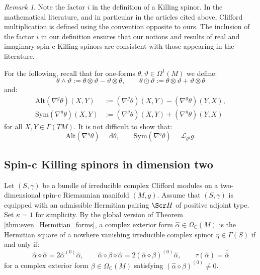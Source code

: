 \documentclass[10pt,a4paper,twoside,reqno]{amsart}
\theoremstyle{plain}
\theoremstyle{definition}
\theoremstyle{remark}
\newtheorem{remark}[thm]{Remark}
\def\C{\mathbb{C}}
\def\dd{\mathrm{d}}
\def\scS{\Scr H}
\def\dd{\mathrm{d}}
\begin{document}
\begin{remark}
    Note the factor $i$ in the definition of a Killing spinor. In the mathematical literature, and in particular in the articles cited above, Clifford multiplication is defined using the convention opposite to ours. The inclusion of the factor $i$ in our definition ensures that our notions and results of real and imaginary spin-c Killing spinors are consistent with those appearing in the literature.
\end{remark}

For the following, recall that for one-forms $\theta,\vartheta\in\Omega^1(M)$ we define: $$\theta\wedge\vartheta:=\theta\otimes\vartheta-\vartheta\otimes\theta,\qquad \theta\odot\vartheta:=\theta\otimes\vartheta+\vartheta\otimes\theta$$ and: \begin{align*}
    \mathrm{Alt}(\nabla^g\theta)(X,Y)&:=(\nabla^g\theta)(X,Y)-(\nabla^g\theta)(Y,X),\\
    \mathrm{Sym}(\nabla^g\theta)(X,Y)&:=(\nabla^g\theta)(X,Y)+(\nabla^g\theta)(Y,X)
\end{align*} for all $X,Y\in\Gamma(TM)$. It is not difficult to show that: $$\mathrm{Alt}(\nabla^g\theta)=\dd\theta,\qquad\mathrm{Sym}(\nabla^g\theta)=\mathscr{L}_{\theta^\sharp}g.$$


\subsection{Spin-c Killing spinors in dimension two}


Let $(S,\gamma)$ be a bundle of irreducible complex Clifford modules on a two-dimensional spin-c Riemannian manifold $(M,g)$. Assume that $(S,\gamma)$ is equipped with an admissible Hermitian pairing $\scS$ of positive adjoint type. Set $\kappa=1$ for simplicity. By the global version of Theorem \ref{thm:even_Hermitian_forms}, a complex exterior form $\widehat{\alpha}\in\Omega_\C(M)$ is the Hermitian square of a nowhere vanishing irreducible complex spinor $\eta\in\Gamma(S)$ if and only if: $$\widehat{\alpha}\diamond\widehat{\alpha}=2\widehat{\alpha}^{(0)}\widehat{\alpha},\qquad \widehat{\alpha}\diamond\beta\diamond\widehat{\alpha}=2(\widehat{\alpha}\diamond\beta)^{(0)}\widehat{\alpha},\qquad \tau(\widehat{\alpha})=\overline{\widehat{\alpha}}$$ for a complex exterior form $\beta\in\Omega_\C(M)$ satisfying $(\widehat{\alpha}\diamond\beta)^{(0)}\neq0$.
\end{document}
